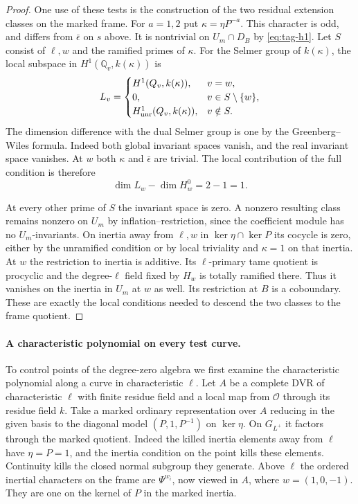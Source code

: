 \begin{proof}
One use of these tests is the construction of the two
residual extension classes on the marked frame. For
\(a=1,2\) put \(\kappa=\eta P^{-a}\). This character is
odd, and differs from \(\bar\epsilon\) on \(s\) above.
It is nontrivial on \(U_m\cap D_B\) by \eqref{eq:tag-h1}. Let \(S\)
consist of \(\ell,w\) and the ramified primes of \(\kappa\).
For the Selmer group of \(k(\kappa)\), the local subspace in \(H^1(\mathbb Q_v,k(\kappa))\) is 
\[
 L_v=\begin{cases}H^1(\mathbb Q_v,k(\kappa)),&v=w,\\ 0,&v\in S\setminus\{w\},\\ H^1_{\rm unr}(\mathbb Q_v,k(\kappa)),&v\notin S.\end{cases}
\]
 The dimension difference
with the dual Selmer group is one by the Greenberg--Wiles
formula. Indeed both global invariant spaces vanish, and
the real invariant space vanishes. At \(w\) both \(\kappa\) and \(\bar\epsilon\) are trivial. The local contribution of the full condition is therefore
\[
 \dim L_w-\dim H^0_w=2-1=1 .
\]

At every other prime of \(S\) the
invariant space is zero. A nonzero resulting class remains
nonzero on \(U_m\) by inflation--restriction, since the
coefficient module has no \(U_m\)-invariants. On inertia
away from \(\ell,w\) in \(\ker\eta\cap\ker P\) its cocycle
is zero, either by the unramified condition or by local
triviality and \(\kappa=1\) on that inertia. At \(w\) the
restriction to inertia is additive. Its \(\ell\)-primary
tame quotient is procyclic and the degree-\(\ell\) field
fixed by \(H_w\) is totally ramified there. Thus it vanishes
on the inertia in \(U_m\) at \(w\) as well. Its restriction
at \(B\) is a coboundary. These are exactly the local
conditions needed to descend the two classes to the frame
quotient.

\end{proof}



\paragraph{A characteristic polynomial on every test curve.}
To control points of the degree-zero algebra we first examine the characteristic
polynomial along a curve in characteristic \(\ell\). Let \(A\) be a complete DVR of
characteristic \(\ell\) with finite residue field and a local map from \(\mathcal O\) through
its residue field \(k\). Take a marked ordinary representation
over \(A\) reducing in the given basis to the diagonal model
\((P,1,P^{-1})\) on \(\ker\eta\). On \(G_{L^+}\) it factors
through the marked quotient. Indeed the killed inertia elements
away from \(\ell\) have \(\eta=P=1\), and the inertia condition
on the point kills these elements. Continuity kills the closed
normal subgroup they generate. Above \(\ell\) the ordered
inertial characters on the frame are \(\Psi^{w_i}\), now
viewed in \(A\), where \(w=(1,0,-1)\). They are one on the
kernel of \(P\) in the marked inertia.

